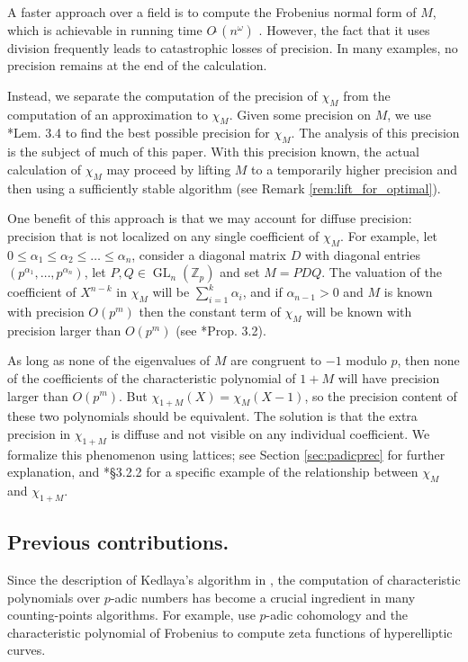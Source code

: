\documentclass{sig-alternate-05-2015}
\DeclareMathOperator{\GL}{GL}
\newcommand{\Z}{\mathbb Z}
\newcommand{\Zp}{\Z_p}
\newcommand{\softO}{O\tilde{~}}
\begin{document}
A faster approach over a field is to compute the Frobenius normal form of $M$,
which is achievable in running time $\softO(n^\omega)$ .
However, the fact that it uses division frequently leads to catastrophic losses of precision.
In many examples, no precision remains at the end of the calculation.

Instead, we separate the computation of the precision of $\chi_M$ from the computation
of an approximation to $\chi_M$.  Given some precision on $M$, we use \cite{caruso-roe-vaccon:14a}*{Lem. 3.4}
to find the best possible precision for $\chi_M$.  The analysis of this precision is the subject
of much of this paper.  With this precision known, the actual calculation of $\chi_M$
may proceed by lifting $M$ to a temporarily higher precision and then using a sufficiently
stable algorithm (see Remark \ref{rem:lift_for_optimal}).

One benefit of this approach is that we may account for diffuse precision:
precision that is not localized on any single coefficient of $\chi_M$.  For example,
let $0 \le \alpha_1 \le \alpha_2 \le \dots \le \alpha_n$, consider a
diagonal matrix $D$ with diagonal entries $(p^{\alpha_1}, \dots, p^{\alpha_n})$,
let $P, Q \in \GL_n(\Zp)$ and set $M = PDQ$.  The valuation of the coefficient
of $X^{n-k}$ in $\chi_M$ will be $\sum_{i=1}^k \alpha_i$, and if $\alpha_{n-1} > 0$
and $M$ is known with precision $O(p^m)$ then the constant term of $\chi_M$
will be known with precision larger than $O(p^m)$ (see
\cite{caruso-roe-vaccon:15a}*{Prop. 3.2}).

As long as none of the eigenvalues of $M$ are congruent to $-1$ modulo $p$,
then none of the coefficients of the characteristic polynomial of $1+M$ will have
precision larger than $O(p^m)$.  But $\chi_{1+M}(X) = \chi_M(X-1)$, so the precision
content of these two polynomials should be equivalent. The solution is that the
extra precision in $\chi_{1+M}$ is diffuse and not visible on any individual coefficient.
We formalize this phenomenon using lattices; see Section \ref{sec:padicprec} for
further explanation, and \cite{caruso:17a}*{\S 3.2.2} for a specific example of the
relationship between $\chi_M$ and $\chi_{1+M}$.

\subsection*{Previous contributions.}

Since the description of Kedlaya's algorithm in
\cite{kedlaya:01a}, the computation of characteristic polynomials
over $p$-adic numbers
has become a crucial ingredient in many counting-points algorithms.
For example, \cite{harvey:07a, harvey:14a} use $p$-adic cohomology
and the characteristic polynomial of Frobenius to compute zeta functions
of hyperelliptic curves.
\end{document}
